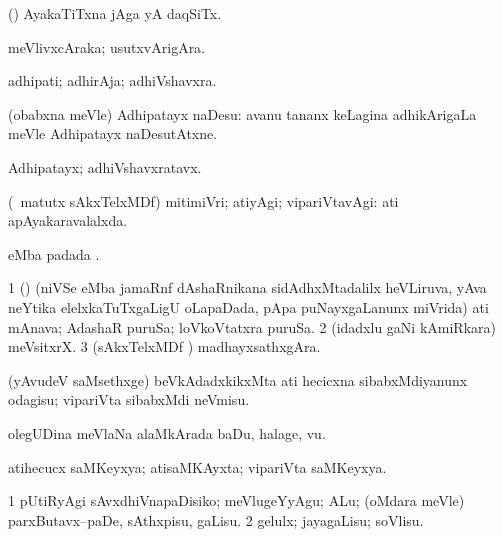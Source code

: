 \bentry
{}
\gl{\nA}
\bmng
(\ame) AyakaTiTxna jAga yA daqSiTx. 
\emng
\eentry


\bentry
{}
\gl{\nA}
\bmng
meVlivxcAraka; usutxvArigAra. 
\emng
\eentry


\bentry
{}
\gl{\nA}
\bmng
adhipati; adhirAja; adhiVshavxra. 
\emng
\eentry


\bentry
{}
\gl{\sakirx}
\bmng
(obabxna meVle) Adhipatayx naDesu:  avanu tananx keLagina adhikArigaLa meVle Adhipatayx naDesutAtxne. 
\emng
\eentry


\bentry
{}
\gl{\nA}
\bmng
Adhipatayx; adhiVshavxratavx. 
\emng
\eentry

\bentry
{}
\gl{\kirxvi}
\bmng
(\ame\ matutx sAkxTelxMDf) mitimiVri; atiyAgi; vipariVtavAgi:  ati apAyakaravalalxda. 
\emng
\eentry

\bentry
{}
\gl{\kirx}
\bmng
{} eMba padada \vakaq. 
\emng
\eentry


\bentry
{}
\gl{\nA}
\bmng
\bnum
\num{1} (\tashA) (niVSe eMba jamaRnf dAshaRnikana sidAdhxMtadalilx heVLiruva, yAva neYtika elelxkaTuTxgaLigU oLapaDada, pApa puNayxgaLanunx miVrida) ati mAnava; AdashaR puruSa; loVkoVtatxra puruSa. 
\num{2} (idadxlu gaNi kAmiRkara) meVsitxrX. 
\num{3} (sAkxTelxMDf \parx) madhayxsathxgAra. 
\enum
\emng
\eentry


\bentry
{}
\gl{\sakirx}
\bmng
(yAvudeV saMsethxge) beVkAdadxkikxMta ati hecicxna sibabxMdiyanunx odagisu; vipariVta sibabxMdi neVmisu. 
\emng
\eentry


\bentry
{}
\gl{\nA}
\bmng
olegUDina meVlaNa alaMkArada baDu, halage, \mo vu. 
\emng
\eentry


\bentry
{}
\gl{\gu}
\bmng
atihecucx saMKeyxya; atisaMKAyxta; vipariVta saMKeyxya. 
\emng
\eentry


\bentry
{}
\gl{\sakirx}
\bmng
\bnum
\num{1} pUtiRyAgi sAvxdhiVnapaDisiko; meVlugeYyAgu; ALu; (oMdara meVle) parxButavx--paDe, sAthxpisu, gaLisu. 
\num{2} gelulx; jayagaLisu; soVlisu. 
\enum
\emng
\eentry


